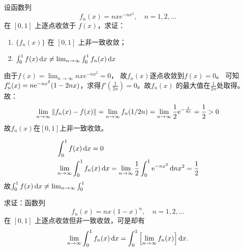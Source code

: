 \begin{problem}
    设函数列\[
        f_n(x) = nx e^{-nx^2} , \quad n = 1, 2, \dots
    \]
    在 \([0, 1]\) 上逐点收敛于 \(f(x)\)，求证：
    \begin{enumerate}
        \item \(\{f_n(x)\}\) 在 \([0, 1]\) 上非一致收敛；
        \item \(\int_{0}^{1} f(x) \d{x} \neq \lim_{n \to \infty}
        \int_{0}^{1} f_n(x) \d{x}\)
    \end{enumerate}
\end{problem}

\begin{solution}
    由于\(f(x) = \lim_{n \to \infty} nx e^{-nx^2} = 0\)，
    故\(f_{n}(x)\)逐点收敛到\(f(x) = 0\)。
    可知\(f_{n}'(x) = n \mathrm{e}^{-nx^{2}}(1-2nx)\)，求得\(f'\left(
    \frac{1}{2n} \right) = 0\)。故\(f_{n}(x)\)
    的最大值在\(\frac{1}{2n}\)处取得。
    故：
    \[
        \lim_{n \to \infty} \left\lVert f_{n}(x) - f(x) \right\rVert
        = \lim_{n \to \infty} f_{n}(1/2n) = \lim_{n \to \infty}
        \frac{1}{2} \mathrm{e}^{-\frac{1}{4n}} = \frac{1}{2} >  0
    \]
    故\(f_{n}(x)\)在\([0,1]\)上非一致收敛。

    \begin{align*}
        & \int_{0}^{1} f(x) \d{x} = 0                       \\
        & \lim_{n \to \infty} \int_{0}^{1} f_{n}(x) \d{x} =
        \lim_{n \to \infty} \frac{1}{2}\int_{0}^{1}
        \e^{-nx^{2}} \d{n}x^{2} = \frac{1}{2}
    \end{align*}
    故\(\int_{0}^{1} f(x) \d{x} \neq \lim_{n \to
    \infty} \int_{0}^{1}\)

\end{solution}

\begin{problem}
    求证：函数列
    \[
        f_n(x) = nx(1-x)^n, \quad n = 1, 2, \dots
    \]
    在 \([0, 1]\) 上逐点收敛但非一致收敛，可是却有
    \[
        \lim_{n \to \infty} \int_0^1 f_n(x) \d{x} =
        \int_0^1 \left[
        \lim_{n \to \infty} f_n(x) \right] \d{x}.
    \]
\end{problem}


